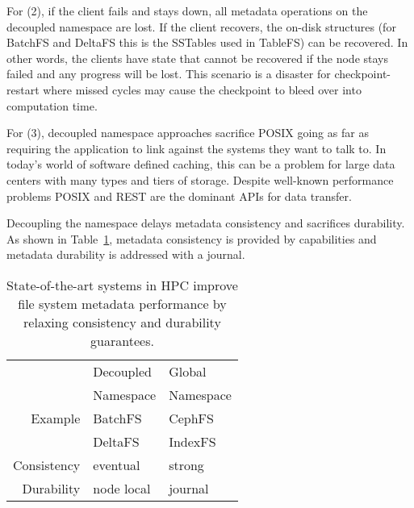 For (2), if the client fails and stays down, all metadata operations on the
decoupled namespace are lost. If the client recovers, the on-disk structures
(for BatchFS and DeltaFS this is the SSTables used in TableFS) can be
recovered. In other words, the clients have state that cannot be recovered if
the node stays failed and any progress will be lost. This scenario is a
disaster for checkpoint-restart where missed cycles may cause the checkpoint to
bleed over into computation time.

For (3), decoupled namespace approaches sacrifice POSIX going as far as
requiring the application to link against the systems they want to talk to. In
today's world of software defined caching, this can be a problem for large data
centers with many types and tiers of storage. Despite well-known performance
problems POSIX and REST are the dominant APIs for data transfer.

Decoupling the namespace delays metadata consistency and sacrifices durability. 
As shown in Table~\ref{table:namespaces}, metadata consistency is
provided by capabilities and metadata durability is addressed with a journal.
\begin{table}
\begin{tabular}{ r | l | l }
              & Decoupled & Global    \\
              & Namespace & Namespace \\\hline
  Example     & BatchFS~\cite{zheng:pdsw2014-batchfs} & CephFS~\cite{weil:sc2004-dyn-metadata} \\
              & DeltaFS~\cite{zheng:pdsw2015-deltafs} & IndexFS~\cite{ren:sc2014-indexfs}      \\
  Consistency & eventual & strong     \\
  Durability  & node local & journal  \\
\end{tabular}
\caption{State-of-the-art systems in HPC improve file system metadata
performance by relaxing consistency and durability
guarantees.\label{table:namespaces}}
\end{table}


